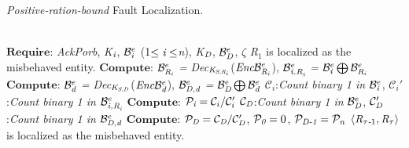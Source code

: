 \begin{algorithm}[t]
\footnotesize
\caption{\emph{Positive-ration-bound} Fault Localization.}
\label{positiveratebasedfaultlocalization}
\begin{algorithmic}[1]
 { }\\
    $\textbf{Require}$: \emph{AckPorb}, \emph{K}$_\emph{i}$, $\mathcal{B}_{\emph{i}}^e$ (1$\leq \emph{i} \leq$\emph{n}), \emph{K}$_\emph{D}$, $\mathcal{B}_{\emph{D}}^e$, $\zeta$
    \State \emph{R}$_1$ is localized as the misbehaved entity.
    \EndIf
    \State $\textbf{Compute}$: $\mathcal{B}_{\emph{R}_\emph{i}}^e$ \emph{=} \emph{Dec}$_{\emph{K}_{\emph{S,R}_\emph{i}}}$($\emph{Enc}\mathcal{B}_{\emph{R}_\emph{i}}^e$), $\mathcal{B}_{\emph{i,R}_\emph{i}}^e$ \emph{=} $\mathcal{B}_{\emph{i}}^e \bigoplus \mathcal{B}_{\emph{R}_\emph{i}}^e$
    \EndFor
    \State $\textbf{Compute}$: $\mathcal{B}_{\emph{d}}^e$ \emph{=} \emph{Dec}$_{\emph{K}_{\emph{S,D}}}$($\emph{Enc}\mathcal{B}_\emph{d}^e$), $\mathcal{B}_{\emph{D,d}}^e$ \emph{=} $\mathcal{B}_{\emph{D}}^e \bigoplus \mathcal{B}_{\emph{d}}^e$
    \State $\mathcal{C}_i$:\emph{Count binary 1 in} $\mathcal{B}_{\emph{i}}^e$,  $\mathcal{C}_i'$:\emph{Count binary 1 in} $\mathcal{B}_{\emph{i,R}_\emph{i}}^e$
    \State $\textbf{Compute}$: $\mathcal{P}_\emph{i} = \mathcal{C}_i/\mathcal{C}_i'$
    \EndFor
    \State $\mathcal{C}_\emph{D}$:\emph{Count binary 1 in} $\mathcal{B}_{\emph{D}}^e$,  $\mathcal{C}_\emph{D}'$:\emph{Count binary 1 in} $\mathcal{B}_{\emph{D,d}}^e$
    \State $\textbf{Compute}$: $\mathcal{P}_\emph{D} = \mathcal{C}_\emph{D}/\mathcal{C}_\emph{D}'$, $\mathcal{P}_\emph{0} = 0$, $\mathcal{P}_\emph{D-1} = \mathcal{P}_\emph{n}$
    \State $\langle \emph{R}_{\tau\emph{-}1}, \emph{R}_{\tau} \rangle$ is localized as the misbehaved entity.
    \EndIf
    \EndFor
\EndFunction
\end{algorithmic}
\end{algorithm} 